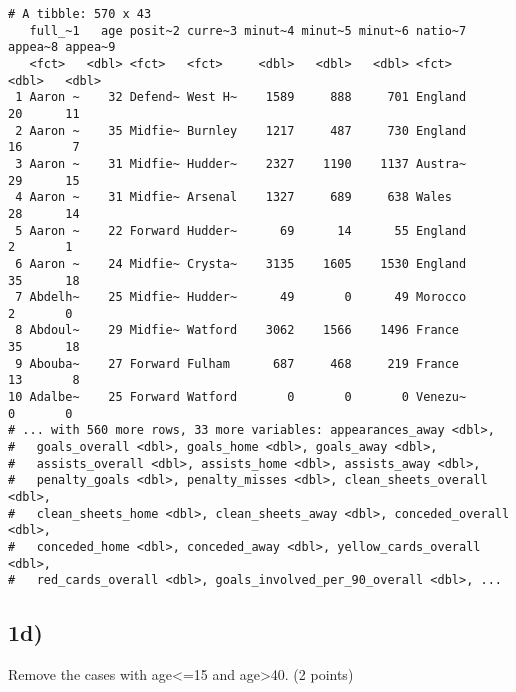 \documentclass[
]{article}
\newenvironment{Shaded}{\begin{snugshade}}{\end{snugshade}}
\newcommand{\DecValTok}[1]{\textcolor[rgb]{0.00,0.00,0.81}{#1}}
\newcommand{\FunctionTok}[1]{\textcolor[rgb]{0.00,0.00,0.00}{#1}}
\newcommand{\NormalTok}[1]{#1}
\newcommand{\OtherTok}[1]{\textcolor[rgb]{0.56,0.35,0.01}{#1}}
\newcommand{\SpecialCharTok}[1]{\textcolor[rgb]{0.00,0.00,0.00}{#1}}
\begin{document}
\begin{verbatim}
# A tibble: 570 x 43
   full_~1   age posit~2 curre~3 minut~4 minut~5 minut~6 natio~7 appea~8 appea~9
   <fct>   <dbl> <fct>   <fct>     <dbl>   <dbl>   <dbl> <fct>     <dbl>   <dbl>
 1 Aaron ~    32 Defend~ West H~    1589     888     701 England      20      11
 2 Aaron ~    35 Midfie~ Burnley    1217     487     730 England      16       7
 3 Aaron ~    31 Midfie~ Hudder~    2327    1190    1137 Austra~      29      15
 4 Aaron ~    31 Midfie~ Arsenal    1327     689     638 Wales        28      14
 5 Aaron ~    22 Forward Hudder~      69      14      55 England       2       1
 6 Aaron ~    24 Midfie~ Crysta~    3135    1605    1530 England      35      18
 7 Abdelh~    25 Midfie~ Hudder~      49       0      49 Morocco       2       0
 8 Abdoul~    29 Midfie~ Watford    3062    1566    1496 France       35      18
 9 Abouba~    27 Forward Fulham      687     468     219 France       13       8
10 Adalbe~    25 Forward Watford       0       0       0 Venezu~       0       0
# ... with 560 more rows, 33 more variables: appearances_away <dbl>,
#   goals_overall <dbl>, goals_home <dbl>, goals_away <dbl>,
#   assists_overall <dbl>, assists_home <dbl>, assists_away <dbl>,
#   penalty_goals <dbl>, penalty_misses <dbl>, clean_sheets_overall <dbl>,
#   clean_sheets_home <dbl>, clean_sheets_away <dbl>, conceded_overall <dbl>,
#   conceded_home <dbl>, conceded_away <dbl>, yellow_cards_overall <dbl>,
#   red_cards_overall <dbl>, goals_involved_per_90_overall <dbl>, ...
\end{verbatim}

\hypertarget{d}{%
\subsection{1d)}\label{d}}

Remove the cases with age\textless=15 and age\textgreater40. (2 points)

\begin{Shaded}
\end{Shaded}
\end{document}

